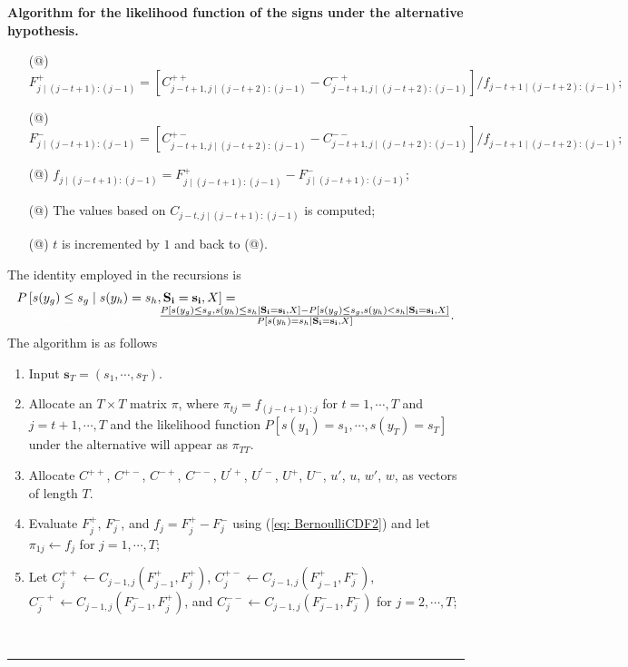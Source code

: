 \documentclass[harvard,11pt]{article}
\makeatletter
\newcommand*{\rom}[1]{\expandafter\@slowromancap\romannumeral #1@}
\newenvironment{proof}[1][Proof]{\textbf{#1.} }{\  \rule{0.5em}{0.5em}}
\makeatother
\begin{document}
\begin{proof}[Algorithm for the likelihood function of the signs under the alternative hypothesis]
\begin{itemize}
\item[(\rom{4})] $F_{j\mid (j-t+1):(j-1)}^+=\left[C_{j-t+1,j\mid(j-t+2):(j-1)}^{++}-C_{j-t+1,j\mid(j-t+2):(j-1)}^{-+}\right]/f_{j-t+1\mid(j-t+2):(j-1)};$
\item[(\rom{5})] $F_{j\mid (j-t+1):(j-1)}^-=\left[C_{j-t+1,j\mid(j-t+2):(j-1)}^{+-}-C_{j-t+1,j\mid(j-t+2):(j-1)}^{--}\right]/f_{j-t+1\mid(j-t+2):(j-1)};$
\item[(\rom{6})] $f_{j\mid (j-t+1):(j-1)}=F_{j\mid (j-t+1):(j-1)}^+-F_{j\mid (j-t+1):(j-1)}^-;$
\item[(\rom{7})] The values based on $C_{j-t,j\mid (j-t+1):(j-1)}$ is computed; 
\item[(\rom{8})] $t$ is incremented by $1$ and back to (\rom{1}).
\end{itemize}
The identity employed in the recursions is
\begingroup
\allowdisplaybreaks
\begin{align*}
\begin{array}{ll}
P\left[s(y_g)\leq s_g\mid s(y_h)=s_h,\mathbf{S_i}=\mathbf{s_i},X\right]=\\
\textcolor{white}{P[s(y_g)\leq s_g\mid s(y_h)=s_h,}\frac{P\left[s(y_g)\leq s_g, s(y_h)\leq s_h\mid\mathbf{S_i}=\mathbf{s_i},X\right]-P\left[s(y_g)\leq s_g, s(y_h)< s_h\mid\mathbf{S_i}=\mathbf{s_i},X\right]}{P\left[s(y_h)=s_h\mid \mathbf{S_i}=\mathbf{s_i},X\right]}.
\end{array}
\end{align*}
 \endgroup
The algorithm is as follows
\begin{enumerate}
\item Input $\mathbf{s}_T=\left(s_1,\cdots,s_T\right)$.
\item Allocate an $T\times T$ matrix $\pi$, where $\pi_{tj}=f_{(j-t+1):j}$ for $t=1,\cdots,T$ and $j=t+1,\cdots,T$ and the likelihood function $P[s(y_1)=s_1,\cdots,s(y_T)=s_T]$ under the alternative will appear as $\pi_{TT}$.
\item Allocate $C^{++}$, $C^{+-}$, $C^{-+}$, $C^{--}$, $U^{'+}$, $U^{'-}$, $U^{+}$, $U^{-}$, $u'$, $u$, $w'$, $w$, as vectors of length $T$.
\item Evaluate $F^{+}_j$, $F^{-}_j$, and $f_j=F^{+}_j-F^{-}_j$ using (\ref{eq: BernoulliCDF2}) and let $\pi_{1j}\leftarrow f_j$ for $j=1,\cdots,T$;  
\item Let $C^{++}_j\leftarrow C_{j-1,j}\left(F^{+}_{j-1},F^{+}_{j}\right)$, $C^{+-}_j\leftarrow C_{j-1,j}\left(F^{+}_{j-1},F^{-}_{j}\right)$, $C^{-+}_j\leftarrow C_{j-1,j}\left(F^{-}_{j-1},F^{+}_{j}\right)$, and $C^{--}_j\leftarrow C_{j-1,j}\left(F^{-}_{j-1},F^{-}_{j}\right)$ for $j=2,\cdots,T$;

\end{enumerate}
\end{proof}
\end{document}
